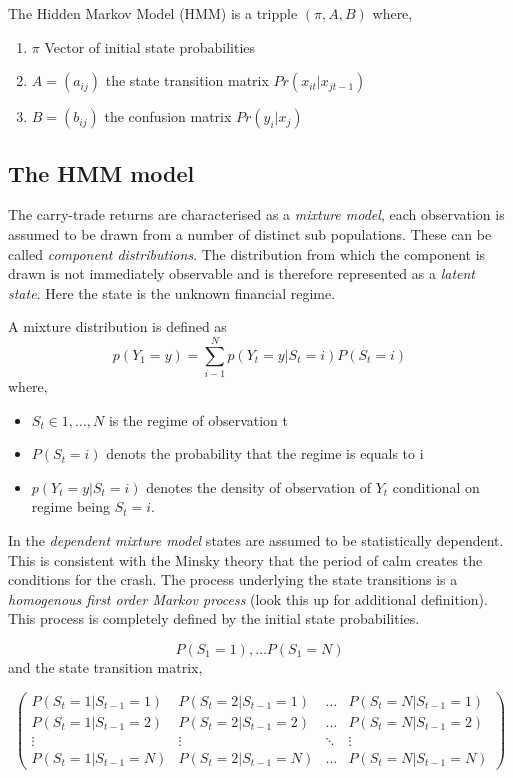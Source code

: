 \documentclass[12pt, a4paper, oneside]{article} %
\begin{document}
The Hidden Markov Model (HMM) is a tripple $(\pi, A, B)$ where, 
\begin{enumerate}
\item $\pi$ Vector of initial state probabilities
\item $A = (a_{ij})$ the state transition matrix $Pr(x_{it}|x_{jt-1})$
\item $B = (b_{ij})$ the confusion matrix $Pr(y_i|x_j)$
\end{enumerate}

\subsection{The HMM model}
The carry-trade returns are characterised as a \emph{mixture model}, each observation is assumed to be drawn from a number of distinct sub populations.  These can be called \emph{component distributions}.  The distribution from which the component is drawn is not immediately observable and is therefore represented as a \emph{latent state}.  Here the state is the unknown financial regime.  

A mixture distribution is defined as 
\begin{equation}
p(Y_1 = y) = \sum_{i - 1}^N p(Y_t = y|S_t = i)P(S_t = i)
\end{equation}
where,
\begin{itemize}
\item $S_t \in {1, \dots, N}$ is the regime of observation t
\item $P(S_t = i)$ denots the probability that the regime is equals to i 
\item $p(Y_t = y|S_t = i)$ denotes the density of observation of $Y_t$ conditional on regime being $S_t = i$.
\end{itemize}

In the \emph{dependent mixture model} states are assumed to be statistically dependent.  This is consistent with the Minsky theory that the period of calm creates the conditions for the crash. The process underlying the state transitions is a \emph{homogenous first order Markov process}  (look this up for additional definition).  This process is completely defined by the initial state probabilities.  

\begin{equation*}
P(S_1 = 1), \dots P(S_1 = N)
\end{equation*}
and the state transition matrix, 

\begin{equation*}
\begin{pmatrix}
P(S_t = 1|S_{t-1}=1) & P(S_t = 2|S_{t-1}=1) & \dots & P(S_t = N|S_{t-1}=1)\\
P(S_t = 1|S_{t-1}=2) & P(S_t = 2|S_{t-1}=2) & \dots & P(S_t = N|S_{t-1}=2)\\
\vdots & \vdots & \ddots & \vdots \\
P(S_t = 1|S_{t-1}=N) & P(S_t = 2|S_{t-1}=N) & \dots & P(S_t = N|S_{t-1}=N)
\end{pmatrix}
\end{equation*}
\end{document}
